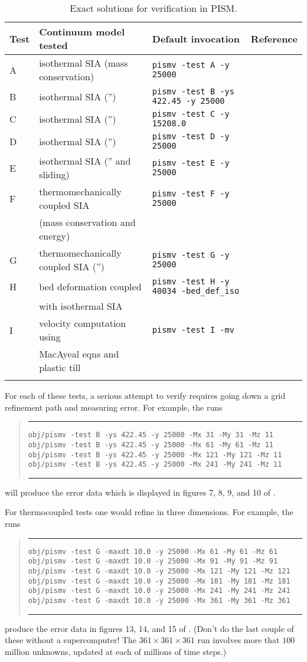 \documentclass[11pt,final]{amsart}
\newcommand{\Vend}{ \rule{4.6in}{0.1mm}\end{quote}\normalsize }
\newcommand{\beginV}{ \scriptsize\begin{quote}\rule{4.6in}{0.1mm}\begin{verbatim} }
\begin{document}
\begin{table}
\caption{Exact solutions for verification in PISM.}\label{tab:tests}
\begin{tabular}{@{}llll}\hline
\small
\textbf{Test} & \textbf{Continuum model tested} & \textbf{Default invocation} & \textbf{Reference} \\ \hline
A & isothermal SIA (mass conservation) & \verb|pismv -test A -y 25000| & \cite{BLKCB} \\
B & isothermal SIA ('') & \verb|pismv -test B -ys 422.45 -y 25000| & \cite{BLKCB} \\
C & isothermal SIA ('') & \verb|pismv -test C -y 15208.0| & \cite{BLKCB} \\
D & isothermal SIA ('') & \verb|pismv -test D -y 25000| & \cite{BLKCB} \\
E & isothermal SIA ('' and sliding) & \verb|pismv -test E -y 25000| & \cite{BLKCB} \\
F & thermomechanically coupled SIA  & \verb|pismv -test F -y 25000| & \cite{BBL,BB} \\
 & \quad (mass conservation and energy) & & \\
G & thermomechanically coupled SIA ('') & \verb|pismv -test G -y 25000| & \cite{BBL,BB} \\
H & bed deformation coupled & \verb|pismv -test H -y 40034 -bed_def_iso| & \cite{BLKfastearth} \\
 & \quad with isothermal SIA & & \\
I & velocity computation using & \verb|pismv -test I -mv| & \cite{MacAyeal,SchoofStream} \\
 & \quad MacAyeal eqns and plastic till & & \\
\hline
\normalsize
\end{tabular}
\end{table}

For each of these tests, a serious attempt to verify requires going down a grid refinement path and measuring error.  For example, the runs
\beginV
obj/pismv -test B -ys 422.45 -y 25000 -Mx 31 -My 31 -Mz 11
obj/pismv -test B -ys 422.45 -y 25000 -Mx 61 -My 61 -Mz 11
obj/pismv -test B -ys 422.45 -y 25000 -Mx 121 -My 121 -Mz 11
obj/pismv -test B -ys 422.45 -y 25000 -Mx 241 -My 241 -Mz 11
\end{verbatim}
\Vend
will produce the error data which is displayed in figures 7, 8, 9, and 10 of \cite{BLKCB}.

For thermocoupled tests one would refine in three dimensions.  For example, the runs
\beginV
obj/pismv -test G -maxdt 10.0 -y 25000 -Mx 61 -My 61 -Mz 61
obj/pismv -test G -maxdt 10.0 -y 25000 -Mx 91 -My 91 -Mz 91
obj/pismv -test G -maxdt 10.0 -y 25000 -Mx 121 -My 121 -Mz 121
obj/pismv -test G -maxdt 10.0 -y 25000 -Mx 181 -My 181 -Mz 181
obj/pismv -test G -maxdt 10.0 -y 25000 -Mx 241 -My 241 -Mz 241
obj/pismv -test G -maxdt 10.0 -y 25000 -Mx 361 -My 361 -Mz 361
\end{verbatim}
\Vend
produce the error data in figures 13, 14, and 15 of \cite{BBL}.  (Don't do the last couple of these without a supercomputer!  The $361\times 361\times 361$ run involves more that $100$ million unknowns, updated at each of millions of time steps.)
\end{document}
